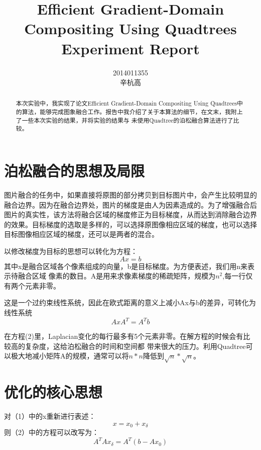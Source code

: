 \documentclass[10pt,twocolumn,letterpaper]{ctexart}
\begin{document}
\title{Efficient Gradient-Domain Compositing Using Quadtrees Experiment Report}

\author{2014011355\\
辛杭高}



\maketitle

\begin{abstract}
   本次实验中，我实现了论文Efficient Gradient-Domain Compositing Using Quadtrees中的算法，能够完成图象融合工作。报告中我介绍了关于本算法的细节，在文末，我附上了一些本次实验的结果，并将实验的结果与
   未使用Quadtree的泊松融合算法进行了比较。
\end{abstract}

\section{泊松融合的思想及局限}
   图片融合的任务中，如果直接将原图的部分拷贝到目标图片中，会产生比较明显的融合边界。因为在融合边界处，图片的梯度是由人为因素造成的。为了增强融合后图片的真实性，该方法将融合区域的梯度修正为目标梯度，从而达到消除融合边界的效果。目标梯度的选取是多样的，可以选择原图像相应区域的梯度，也可以选择目标图像相应区域的梯度，还可以是两者的混合。

   以修改梯度为目标的思想可以转化为方程：
   \begin{equation}
      Ax = b
   \end{equation}
   其中x是融合区域各个像素组成的向量，b是目标梯度。为方便表述，我们用n来表示待融合区域
   像素的数目。A是用来求像素梯度的稀疏矩阵，规模为$n^2$,每一行仅有两个元素非零。

   这是一个过约束线性系统，因此在欧式距离的意义上减小Ax与b的差异，可转化为线性系统
   \begin{equation}
      AxA^{T} = A^{T}b
   \end{equation}

   在方程(2)里，Laplacian变化的每行最多有5个元素非零。在解方程的时候会有比较高的复杂度，这给泊松融合的时间和空间都
   带来很大的压力。利用Quadtree可以极大地减小矩阵A的规模，通常可以将$n * n$降低到$ \sqrt{n} *  \sqrt{n}$。

\section{优化的核心思想}
   对（1）中的x重新进行表述：
   \begin{equation}
      x = x_0 + x_\delta
   \end{equation}
   则（2）中的方程可以改写为：
   \begin{equation}
      A^{T}Ax_\delta = A^{T}(b-Ax_0)
   \end{equation}
\end{document}
